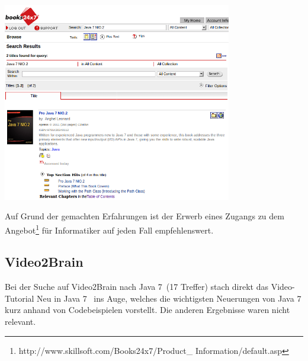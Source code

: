 \begin{center}
\includegraphics[width=10cm]{images/books247.png}
\end{center}

Auf Grund der gemachten Erfahrungen ist der Erwerb eines Zugangs zu dem Angebot\footnote{http://www.skillsoft.com/Books24x7/Product\_ Information/default.asp} für Informatiker auf jeden Fall empfehlenswert.

\subsection{Video2Brain}
Bei der Suche auf Video2Brain nach \glqq Java 7\grqq~(17 Treffer) stach direkt das Video-Tutorial \glqq Neu in Java 7\grqq\cite{v2bJava7}~
ins Auge, welches die wichtigsten Neuerungen von Java 7 kurz anhand von Codebeispielen vorstellt.
Die anderen Ergebnisse waren nicht relevant.
%




